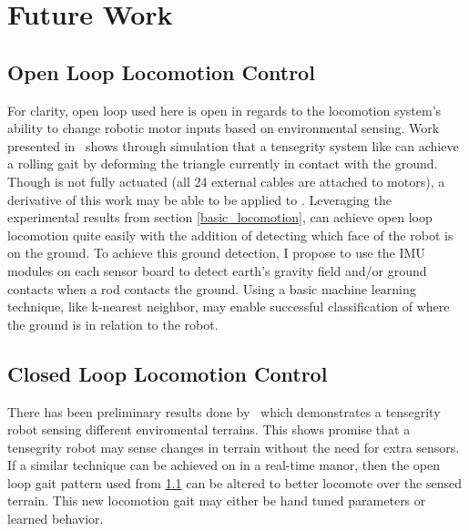\section{Future Work}


\subsection{Open Loop Locomotion Control}
\label{open_loop}
For clarity, open loop used here is open in regards to the locomotion system's ability to change robotic motor inputs based on environmental sensing.
Work presented in~\cite{iscen2014flop} shows through simulation that a tensegrity system like \SB{} can achieve a rolling gait by deforming the triangle currently in contact with the ground.
Though \SB{} is not fully actuated (all 24 external cables are attached to motors), a derivative of this work may be able to be applied to \SB{}.
Leveraging the experimental results from section \ref{basic_locomotion}, \SB{} can achieve open loop locomotion quite easily with the addition of detecting which face of the robot is on the ground.
To achieve this ground detection, I propose to use the IMU modules on each sensor board to detect earth's gravity field and/or ground contacts when a rod contacts the ground.
Using a basic machine learning technique, like k-nearest neighbor, may enable successful classification of where the ground is in relation to the robot.

\subsection{Closed Loop Locomotion Control}
There has been preliminary results done by~\cite{burms2015online} which demonstrates a tensegrity robot sensing different enviromental terrains.
This shows promise that a tensegrity robot may sense changes in terrain without the need for extra sensors.
If a similar technique can be achieved on \SB{} in a real-time manor, then the open loop gait pattern used from \ref{open_loop} can be altered to better locomote over the sensed terrain.
This new locomotion gait may either be hand tuned parameters or learned behavior.

